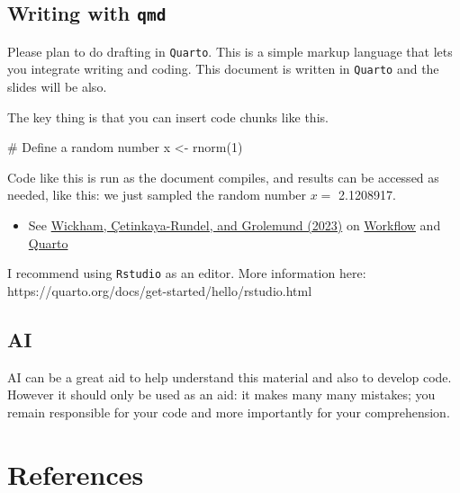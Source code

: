 \documentclass[
  10pt,
  a4paper,10pt]{extarticle}
\newenvironment{Shaded}{\begin{snugshade}}{\end{snugshade}}
\newcommand{\CommentTok}[1]{\textcolor[rgb]{0.37,0.37,0.37}{#1}}
\newcommand{\DecValTok}[1]{\textcolor[rgb]{0.68,0.00,0.00}{#1}}
\newcommand{\FunctionTok}[1]{\textcolor[rgb]{0.28,0.35,0.67}{#1}}
\newcommand{\NormalTok}[1]{\textcolor[rgb]{0.00,0.23,0.31}{#1}}
\newcommand{\OtherTok}[1]{\textcolor[rgb]{0.00,0.23,0.31}{#1}}
\providecommand{\tightlist}{%
  \setlength{\itemsep}{0pt}\setlength{\parskip}{0pt}}
\begin{document}
\subsection{\texorpdfstring{Writing with
\texttt{qmd}}{Writing with qmd}}\label{writing-with-qmd}

Please plan to do drafting in \texttt{Quarto}. This is a simple markup
language that lets you integrate writing and coding. This document is
written in \texttt{Quarto} and the slides will be also.

The key thing is that you can insert code chunks like this.

\begin{Shaded}
\begin{Highlighting}[]
\CommentTok{\# Define a random number}
\NormalTok{x }\OtherTok{\textless{}{-}} \FunctionTok{rnorm}\NormalTok{(}\DecValTok{1}\NormalTok{)}
\end{Highlighting}
\end{Shaded}

Code like this is run as the document compiles, and results can be
accessed as needed, like this: we just sampled the random number \(x =\)
2.1208917.

\begin{itemize}
\tightlist
\item
  See \href{https://r4ds.hadley.nz/}{Wickham, Çetinkaya-Rundel, and
  Grolemund (2023)} on
  \href{https://r4ds.hadley.nz/workflow-scripts}{Workflow} and
  \href{https://r4ds.hadley.nz/quarto}{Quarto}
\end{itemize}

I recommend using \texttt{Rstudio} as an editor. More information here:
https://quarto.org/docs/get-started/hello/rstudio.html

\subsection{AI}\label{ai}

AI can be a great aid to help understand this material and also to
develop code. However it should only be used as an aid: it makes many
many mistakes; you remain responsible for your code and more importantly
for your comprehension.

\section*{References}\label{references}
\end{document}
